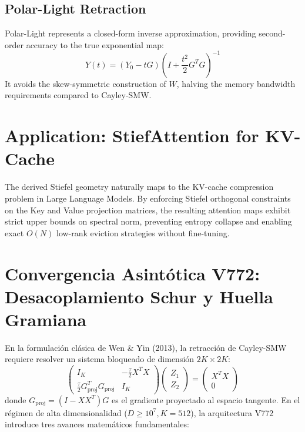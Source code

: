 \subsection{Polar-Light Retraction}
Polar-Light represents a closed-form inverse approximation, providing second-order accuracy to the true exponential map:
\begin{equation}
Y(t) = (Y_0 - t G) \left( I + \frac{t^2}{2} G^T G \right)^{-1}
\end{equation}
It avoids the skew-symmetric construction of $W$, halving the memory bandwidth requirements compared to Cayley-SMW.

\section{Application: StiefAttention for KV-Cache}

The derived Stiefel geometry naturally maps to the KV-cache compression problem in Large Language Models. By enforcing Stiefel orthogonal constraints on the Key and Value projection matrices, the resulting attention maps exhibit strict upper bounds on spectral norm, preventing entropy collapse and enabling exact $O(N)$ low-rank eviction strategies without fine-tuning.

\section{Convergencia Asintótica V772: Desacoplamiento Schur y Huella Gramiana}


En la formulación clásica de Wen \& Yin (2013), la retracción de Cayley-SMW requiere resolver un sistema bloqueado de dimensión $2K \times 2K$:
\begin{equation}
\begin{pmatrix} I_K & -\frac{\tau}{2} X^T X \\ \frac{\tau}{2} G_{\text{proj}}^T G_{\text{proj}} & I_K \end{pmatrix} 
\begin{pmatrix} Z_1 \\ Z_2 \end{pmatrix} = \begin{pmatrix} X^T X \\ 0 \end{pmatrix}

\end{equation}
donde $G_{\text{proj}} = (I - X X^T) G$ es el gradiente proyectado al espacio tangente. En el régimen de alta dimensionalidad ($D \ge 10^7, K = 512$), la arquitectura V772 introduce tres avances matemáticos fundamentales:

